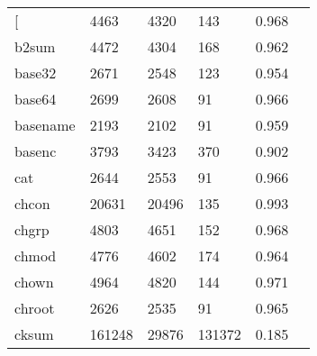 \begin{longtable}{lp{2.4cm}p{2.4cm}p{2.4cm}p{2.4cm}p{2.4cm}}
\bottomrule
\endlastfoot
{[}         &                                    4463 &                        4320 &                          143 &                                   0.968 \\
b2sum     &                                    4472 &                        4304 &                          168 &                                   0.962 \\
base32    &                                    2671 &                        2548 &                          123 &                                   0.954 \\
base64    &                                    2699 &                        2608 &                           91 &                                   0.966 \\
basename  &                                    2193 &                        2102 &                           91 &                                   0.959 \\
basenc    &                                    3793 &                        3423 &                          370 &                                   0.902 \\
cat       &                                    2644 &                        2553 &                           91 &                                   0.966 \\
chcon     &                                   20631 &                       20496 &                          135 &                                   0.993 \\
chgrp     &                                    4803 &                        4651 &                          152 &                                   0.968 \\
chmod     &                                    4776 &                        4602 &                          174 &                                   0.964 \\
chown     &                                    4964 &                        4820 &                          144 &                                   0.971 \\
chroot    &                                    2626 &                        2535 &                           91 &                                   0.965 \\
cksum     &                                  161248 &                       29876 &                       131372 &                                   0.185 \\

\end{longtable}
